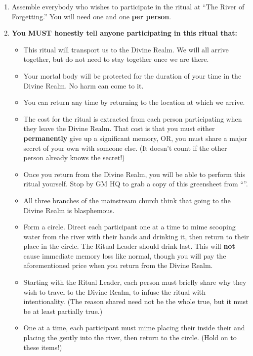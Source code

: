\documentclass[green]{GL2020}
\begin{document}
\begin{enumerate}
    \item Assemble everybody who wishes to participate in the ritual at ``The River of Forgetting.'' You will need one \iGlassVial{} and one \iRitualCandle{} \textbf{per person}.
    \item \textbf{You MUST honestly tell anyone participating in this ritual that:}
    \begin{itemize}
        \item This ritual will transport us to the Divine Realm. We will all arrive together, but do not need to stay together once we are there.
        \item Your mortal body will be protected for the duration of your time in the Divine Realm. No harm can come to it.
        \item You can return any time by returning to the location at which we arrive.
        \item The cost for the ritual is extracted from each person participating when they leave the Divine Realm. That cost is that you must either \textbf{permanently} give up a significant memory, OR, you must share a major secret of your own with someone else. (It doesn't count if the other person already knows the secret!)
        \item Once you return from the Divine Realm, you will be able to perform this ritual yourself. Stop by GM HQ to grab a copy of this greensheet from ``\sSignG{}''.
        \item All three branches of the mainstream church think that going to the Divine Realm is blasphemous.
    \end{itemize}
    \begin{itemize}
        \item Form a circle. Direct each participant one at a time to mime scooping water from the river with their hands and drinking it, then return to their place in the circle. The Ritual Leader should drink last. This will \textbf{not} cause immediate memory loss like normal, though you will pay the aforementioned price when you return from the Divine Realm.
        \item Starting with the Ritual Leader, each person must briefly share why they wish to travel to the Divine Realm, to infuse the ritual with intentionality. (The reason shared need not be the whole true, but it must be at least partially true.)
        \item One at a time, each participant must mime placing their \iRitualCandle{} inside their \iGlassVial{} and placing the \iGlassVial{} gently into the river, then return to the circle. (Hold on to these items!)

\end{itemize}
\end{enumerate}
\end{document}
